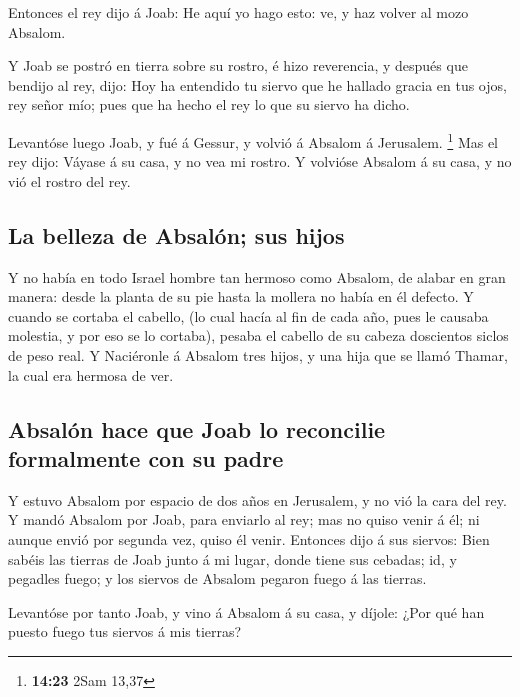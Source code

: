  Entonces el rey dijo á Joab: He aquí yo hago esto: ve, y
haz volver al mozo Absalom.

 Y Joab se postró en tierra sobre su rostro, é hizo
reverencia, y después que bendijo al rey, dijo: Hoy ha entendido tu
siervo que he hallado gracia en tus ojos, rey señor mío; pues que ha
hecho el rey lo que su siervo ha dicho.

 Levantóse luego Joab, y fué á Gessur, y volvió á Absalom á
Jerusalem. \footnote{\textbf{14:23} 2Sam 13,37}  Mas el rey
dijo: Váyase á su casa, y no vea mi rostro. Y volvióse Absalom á su
casa, y no vió el rostro del rey.

\hypertarget{la-belleza-de-absaluxf3n-sus-hijos}{%
\subsection{La belleza de Absalón; sus
hijos}\label{la-belleza-de-absaluxf3n-sus-hijos}}

 Y no había en todo Israel hombre tan hermoso como Absalom,
de alabar en gran manera: desde la planta de su pie hasta la mollera no
había en él defecto.  Y cuando se cortaba el cabello, (lo
cual hacía al fin de cada año, pues le causaba molestia, y por eso se lo
cortaba), pesaba el cabello de su cabeza doscientos siclos de peso real.
 Y Naciéronle á Absalom tres hijos, y una hija que se llamó
Thamar, la cual era hermosa de ver.

\hypertarget{absaluxf3n-hace-que-joab-lo-reconcilie-formalmente-con-su-padre}{%
\subsection{Absalón hace que Joab lo reconcilie formalmente con su
padre}\label{absaluxf3n-hace-que-joab-lo-reconcilie-formalmente-con-su-padre}}

 Y estuvo Absalom por espacio de dos años en Jerusalem, y
no vió la cara del rey.  Y mandó Absalom por Joab, para
enviarlo al rey; mas no quiso venir á él; ni aunque envió por segunda
vez, quiso él venir.  Entonces dijo á sus siervos: Bien
sabéis las tierras de Joab junto á mi lugar, donde tiene sus cebadas;
id, y pegadles fuego; y los siervos de Absalom pegaron fuego á las
tierras.

 Levantóse por tanto Joab, y vino á Absalom á su casa, y
díjole: ¿Por qué han puesto fuego tus siervos á mis tierras?

